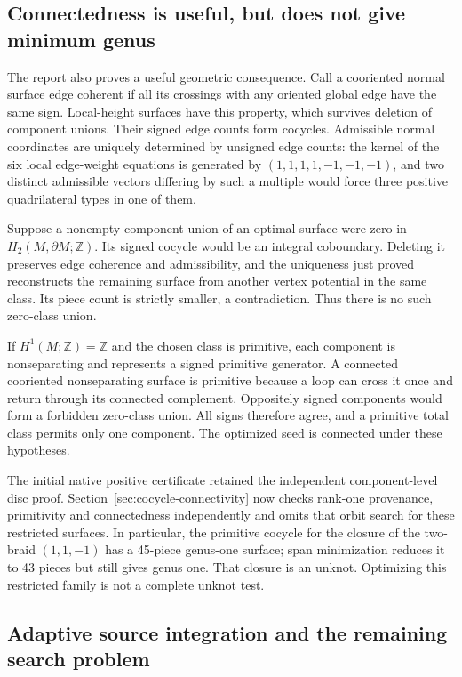 \subsection{Connectedness is useful, but does not give minimum genus}

The report also proves a useful geometric consequence. Call a cooriented
normal surface edge coherent if all its crossings with any oriented global
edge have the same sign. Local-height surfaces have this property, which
survives deletion of component unions. Their signed edge counts form
cocycles. Admissible normal coordinates are uniquely determined by unsigned
edge counts: the kernel of the six local edge-weight equations is generated
by $(1,1,1,1,-1,-1,-1)$, and two distinct admissible vectors differing by
such a multiple would force three positive quadrilateral types in one of
them.

Suppose a nonempty component union of an optimal surface were zero in
$H_2(M,\partial M;\mathbb Z)$. Its signed cocycle would be an integral
coboundary. Deleting it preserves edge coherence and admissibility, and
the uniqueness just proved reconstructs the remaining surface from another
vertex potential in the same class. Its piece count is strictly smaller,
a contradiction. Thus there is no such zero-class union.

If $H^1(M;\mathbb Z)=\mathbb Z$ and the chosen class is primitive, each
component is nonseparating and represents a signed primitive generator.
A connected cooriented nonseparating surface is primitive because a loop
can cross it once and return through its connected complement. Oppositely
signed components would form a forbidden zero-class union. All signs
therefore agree, and a primitive total class permits only one component.
The optimized seed is connected under these hypotheses.

The initial native positive certificate retained the independent
component-level disc proof. Section~\ref{sec:cocycle-connectivity} now
checks rank-one provenance, primitivity and connectedness independently
and omits that orbit search for these restricted surfaces. In particular,
the primitive cocycle for the closure of the two-braid $(1,1,-1)$ has a
45-piece genus-one surface; span minimization reduces it to 43 pieces but
still gives genus one. That closure is an unknot. Optimizing this restricted
family is not a complete unknot test.

\subsection{Adaptive source integration and the remaining search problem}

